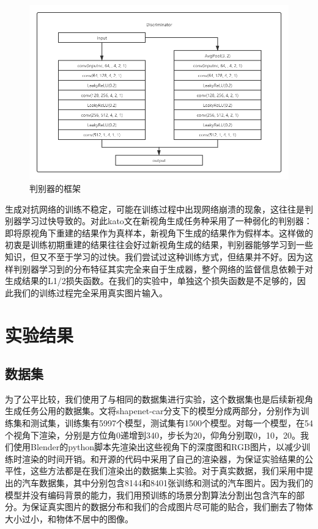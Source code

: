 \documentclass[UTF8,openany,AutoFakeBold,AutoFakeSlant,cs4size]{ctexbook}
\begin{document}
\begin{figure}
\centering
\includegraphics[width=15cm]{./images/discriminator.png}
\caption{判别器的框架}
\label{fig:sample}
\end{figure}

生成对抗网络的训练不稳定，可能在训练过程中出现网络崩溃的现象，这往往是判别器学习过快导致的。对此kato文在新视角生成任务种采用了一种弱化的判别器：即将原视角下重建的结果作为真样本，新视角下生成的结果作为假样本。这样做的初衷是训练初期重建的结果往往会好过新视角生成的结果，判别器能够学习到一些知识，但又不至于学习的过快。我们尝试过这种训练方式，但结果并不好。因为这样判别器学习到的分布特征其实完全来自于生成器，整个网络的监督信息依赖于对生成结果的L1/2损失函数。在我们的实验中，单独这个损失函数是不足够的，因此我们的训练过程完全采用真实图片输入。



\clearpage

\chapter{实验结果}

\section{数据集}

为了公平比较，我们使用了与\cite{Zhou2016ViewSB}相同的数据集进行实验，这个数据集也是后续新视角生成任务公用的数据集。\cite{Zhou2016ViewSB}文将shapenet-car分支下的模型分成两部分，分别作为训练集和测试集，训练集有5997个模型，测试集有1500个模型。对每一个模型，\cite{Zhou2016ViewSB}在54个视角下渲染，分别是方位角0递增到340，步长为20，仰角分别取0，10，20。我们使用Blender的python脚本先渲染出这些视角下的深度图和RGB图片，以减少训练时渲染的时间开销。\cite{Zhou2016ViewSB}和\cite{Su2015MultiviewCN}开源的代码中采用了自己的渲染器，为保证实验结果的公平性，这些方法都是在我们渲染出的数据集上实验。对于真实数据，我们采用\cite{6755945}中提出的汽车数据集，其中分别包含8144和8401张训练和测试的汽车图片。因为我们的模型并没有编码背景的能力，我们用预训练的场景分割算法分割出包含汽车的部分。为保证真实图片的数据分布和我们的合成图片尽可能的贴合，我们删去了物体大小过小，和物体不居中的图像。
\end{document}
